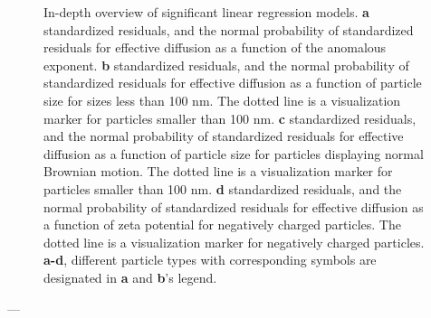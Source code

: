 \documentclass[a4paper]{article}
\begin{document}
\begin{figure}[H]
    \centering
    \caption{In-depth overview of significant linear regression models. \textbf{a} standardized residuals, and the normal probability of standardized residuals for effective diffusion as a function of the anomalous exponent. \textbf{b} standardized residuals, and the normal probability of standardized residuals for effective diffusion as a function of particle size for sizes less than 100 nm. The dotted line is a visualization marker for particles smaller than 100 nm. \textbf{c} standardized residuals, and the normal probability of standardized residuals for effective diffusion as a function of particle size for particles displaying normal Brownian motion. The dotted line is a visualization marker for particles smaller than 100 nm. \textbf{d} standardized residuals, and the normal probability of standardized residuals for effective diffusion as a function of zeta potential for negatively charged particles. The dotted line is a visualization marker for negatively charged particles. \textbf{a-d}, different particle types with corresponding symbols are designated in \textbf{a} and \textbf{b}'s legend. 
    }
    \label{fig:IndepthSLRAna2}
\end{figure}
 


—
%
%


\end{document}
